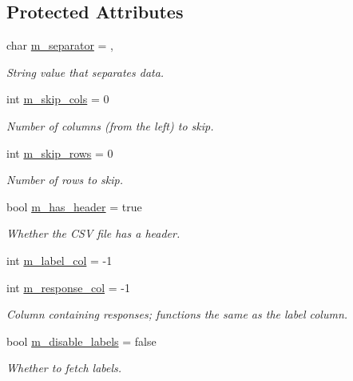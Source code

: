 \subsection*{Protected Attributes}
\begin{DoxyCompactItemize}
\item 
char \hyperlink{classlbann_1_1csv__reader_abab4a731daa751856f083c117ac8862a}{m\+\_\+separator} = \textquotesingle{},\textquotesingle{}
\begin{DoxyCompactList}\small\item\em String value that separates data. \end{DoxyCompactList}\item 
int \hyperlink{classlbann_1_1csv__reader_a3a6cb698fbeb4abd0032e2b018bbb326}{m\+\_\+skip\+\_\+cols} = 0
\begin{DoxyCompactList}\small\item\em Number of columns (from the left) to skip. \end{DoxyCompactList}\item 
int \hyperlink{classlbann_1_1csv__reader_a52b9eebd06309a8d8858ce74ecd8cce0}{m\+\_\+skip\+\_\+rows} = 0
\begin{DoxyCompactList}\small\item\em Number of rows to skip. \end{DoxyCompactList}\item 
bool \hyperlink{classlbann_1_1csv__reader_a36d5e554882e8a32e1d111701af3bd90}{m\+\_\+has\+\_\+header} = true
\begin{DoxyCompactList}\small\item\em Whether the C\+SV file has a header. \end{DoxyCompactList}\item 
int \hyperlink{classlbann_1_1csv__reader_acc02e56c81421c4507f7178ca8461b04}{m\+\_\+label\+\_\+col} = -\/1
\item 
int \hyperlink{classlbann_1_1csv__reader_a1cfa3562ecd0a7f6358290f299de5812}{m\+\_\+response\+\_\+col} = -\/1
\begin{DoxyCompactList}\small\item\em Column containing responses; functions the same as the label column. \end{DoxyCompactList}\item 
bool \hyperlink{classlbann_1_1csv__reader_a5f013485fc1466dcf1f78ef020b845d4}{m\+\_\+disable\+\_\+labels} = false
\begin{DoxyCompactList}\small\item\em Whether to fetch labels. \end{DoxyCompactList}\item 

\end{DoxyCompactItemize}
